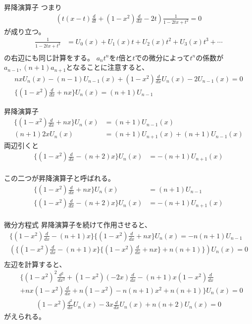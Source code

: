 \documentclass[dvipdfmx]{beamer}
\begin{document}
\begin{frame}{昇降演算子}
つまり
\begin{align*}
(t(x-t)\frac{d}{dt}+(1-x^2)\frac{d}{dx}-2t)\frac{1}{1-2tx+t^2}=0
\end{align*}
が成り立つ。
\begin{align*}
\frac{1}{1-2tx+t^2}&=U_0(x)+U_1(x)t+U_2(x)t^2+U_3(x)t^3+\cdots\\
\end{align*}
の右辺にも同じ計算をする。
$a_nt^n$を$t$倍と$t$での微分によって$t^n$の係数が$a_{n-1}, (n+1)a_{n+1}$となることに注意すると、
\begin{align*}
nxU_n(x)-(n-1)U_{n-1}(x)+(1-x^2)\frac{d}{dx}U_n(x)-2U_{n-1}(x)=0\\
\{(1-x^2)\frac{d}{dx}+nx\}U_n(x)=(n+1)U_{n-1}
\end{align*}
\end{frame}

\begin{frame}{昇降演算子}
\begin{align*}
\{(1-x^2)\frac{d}{dx}+nx\}U_n(x)&=(n+1)U_{n-1}(x)\\
(n+1)2xU_n(x)&=(n+1)U_{n+1}(x)+(n+1)U_{n-1}(x)
\end{align*}
両辺引くと
\begin{align*}
\{(1-x^2)\frac{d}{dx}-(n+2)x\}U_n(x)&=-(n+1)U_{n+1}(x)\\
\end{align*}

この二つが昇降演算子と呼ばれる。
\begin{align*}
\{(1-x^2)\frac{d}{dx}+nx\}U_n(x)&=(n+1)U_{n-1}\\
\{(1-x^2)\frac{d}{dx}-(n+2)x\}U_n(x)&=-(n+1)U_{n+1}(x)\\
\end{align*}
\end{frame}

\begin{frame}{微分方程式}
昇降演算子を続けて作用させると、
\begin{align*}
\{(1-x^2)\frac{d}{dx}-(n+1)x\}\{(1-x^2)\frac{d}{dx}+nx\}U_n(x)=-n(n+1)U_{n-1}\\
(\{(1-x^2)\frac{d}{dx}-(n+1)x\}\{(1-x^2)\frac{d}{dx}+nx\}+n(n+1)\})U_n(x)=0\\
\end{align*}
左辺を計算すると、
\begin{align*}
&\{(1-x^2)^2\frac{d^2}{dx^2}+(1-x^2)(-2x)\frac{d}{dx}-(n+1)x(1-x^2)\frac{d}{dx}\\
&+nx(1-x^2)\frac{d}{dx}+n(1-x^2)-n(n+1)x^2+n(n+1)\}U_n(x)=0
\end{align*}
\begin{align*}
(1-x^2)\frac{d^2}{dx}U_n(x)-3x\frac{d}{dx}U_n(x)+n(n+2)U_n(x)=0
\end{align*}
がえられる。
\end{frame}
\end{document}
